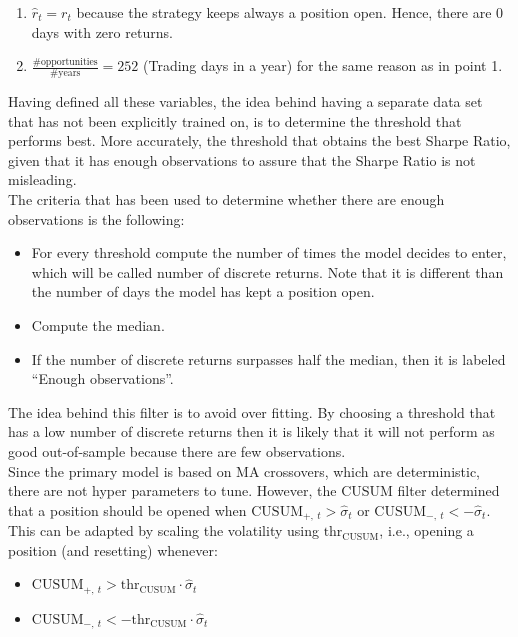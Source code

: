 \documentclass[a4paper]{article}
\begin{document}
\begin{enumerate}
	\item $\hat{r}_t = r_t$ because the strategy keeps always a 
	position open. Hence, there are 0 days with zero returns.
	
	\item $\frac{\# \text{opportunities}}{\# \text{years}} = 252$ 
	(Trading days in a year) for the same reason as in point 1.	
\end{enumerate}

Having defined all these variables, the idea behind having a separate 
data set that has not been explicitly trained on, is to determine the 
threshold that performs best. More accurately, the threshold that 
obtains the best Sharpe Ratio, given that it has enough observations 
to assure that the Sharpe Ratio is not misleading.\\

The criteria that has been used to determine whether there are enough 
observations is the following:

\begin{itemize}
	\item For every threshold compute the number of times the model 
	decides to enter, which will be called number of discrete returns. 
	Note that it is different than the number of days the model has 
	kept a position open.
	
	\item Compute the median.
	
	\item If the number of discrete returns surpasses half the median,
	then it is labeled ``Enough observations''.
\end{itemize}

The idea behind this filter is to avoid over fitting. By choosing a 
threshold that has a low number of discrete returns then it is likely 
that it will not perform as good out-of-sample because there are few 
observations.\\

Since the primary model is based on MA crossovers, which are 
deterministic, there are not hyper parameters to tune. However, the 
CUSUM filter determined that a position should be opened when 
$\text{CUSUM}_{+,\ t} > \hat{\sigma}_t$ or 
$\text{CUSUM}_{-,\ t} < -\hat{\sigma}_t$. This can be adapted by 
scaling the volatility using $\text{thr}_{\text{CUSUM}}$, i.e., 
opening a position (and resetting) whenever:

\begin{itemize}
	\item $\text{CUSUM}_{+,\ t} > \text{thr}_{\text{CUSUM}} \cdot
	\hat{\sigma}_t$
	\item $\text{CUSUM}_{-,\ t} < -\text{thr}_{\text{CUSUM}} \cdot
	\hat{\sigma}_t$
\end{itemize}
\end{document}

